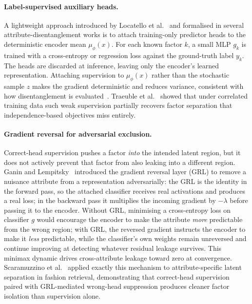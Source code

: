 \paragraph{Label-supervised auxiliary heads.}
A lightweight approach introduced by Locatello et al.~\citep{locatello2020weakly} and
formalised in several attribute-disentanglement works is to attach training-only predictor
heads to the deterministic encoder mean $\mu_\phi(x)$. For each known factor $k$, a small
MLP $g_k$ is trained with a cross-entropy or regression loss against the ground-truth label
$y_k$. The heads are discarded at inference, leaving only the encoder's learned
representation. Attaching supervision to $\mu_\phi(x)$ rather than the stochastic sample
$z$ makes the gradient deterministic and reduces variance, consistent with how
disentanglement is evaluated~\citep{eastwood2018framework,
challeau2019challenging}. Traeuble et al.~\citep{traeuble2021disentangled} showed that
under correlated training data such weak supervision partially recovers factor separation
that independence-based objectives miss entirely.

\paragraph{Gradient reversal for adversarial exclusion.}
Correct-head supervision pushes a factor \emph{into} the intended latent region, but it
does not actively prevent that factor from also leaking into a different region. Ganin and
Lempitsky~\citep{ganin2015unsupervised, ganin2016domain} introduced the gradient reversal
layer (GRL) to remove a nuisance attribute from a representation adversarially: the GRL
is the identity in the forward pass, so the attached classifier receives real activations
and produces a real loss; in the backward pass it multiplies the incoming gradient by
$-\lambda$ before passing it to the encoder. Without GRL, minimising a cross-entropy loss
on classifier $g$ would encourage the encoder to make the attribute \emph{more} predictable
from the wrong region; with GRL, the reversed gradient instructs the encoder to make it
\emph{less} predictable, while the classifier's own weights remain unreversed and continue
improving at detecting whatever residual leakage survives. This minimax dynamic drives
cross-attribute leakage toward zero at convergence. Scaramuzzino et
al.~\citep{attribute_disentanglement} applied exactly this mechanism to attribute-specific
latent separation in fashion retrieval, demonstrating that correct-head supervision paired
with GRL-mediated wrong-head suppression produces cleaner factor isolation than supervision
alone.

